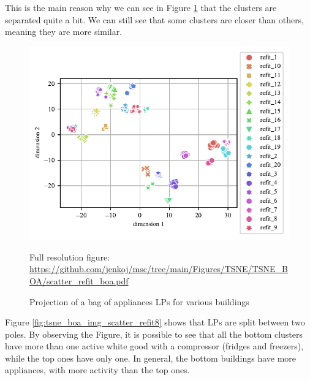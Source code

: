 This is the main reason why we can see in Figure \ref{fig:tsne_boa_scatter_refit8} that the clusters are separated quite a bit.
We can still see that some clusters are closer than others,
meaning they are more similar.

\begin{figure}[H]
	\centering
	\caption{Projection of a bag of appliances LPs for various buildings}
	\includegraphics[]{Figures/TSNE/TSNE_BOA/scatter_refit_boa.pdf}
	\label{fig:tsne_boa_scatter_refit8}
	\par
	\par\footnotesize{Full resolution figure: \url{https://github.com/jenkoj/msc/tree/main/Figures/TSNE/TSNE_BOA/scatter_refit_boa.pdf}}
\end{figure} 

Figure \ref{fig:tsne_boa_img_scatter_refit8} shows that LPs are split
between two poles.
By observing the Figure, it is possible to see that all the bottom clusters
have more than one active white good with a compressor (fridges and freezers), while
the top ones have only one. In general, the bottom buildings have more appliances,
with more activity than the top ones.

